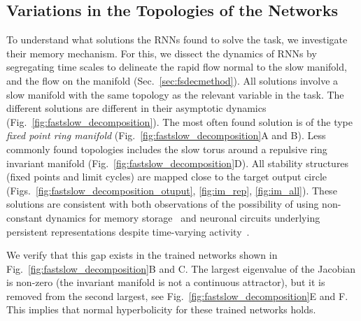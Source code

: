 \documentclass{article} %
\newcounter{ct}
\theoremstyle{definition}
\theoremstyle{remark}
\begin{document}
\subsection{Variations in the Topologies of the Networks}\label{sec:topologies}
To understand what solutions the RNNs found to solve the task, we investigate their memory mechanism.
For this, we dissect the dynamics of RNNs by segregating time scales to delineate the rapid flow normal to the slow manifold, and the flow on the manifold (Sec.~\ref{sec:fsdecmethod}).
All solutions involve a slow manifold with the same topology as the relevant variable in the task.
The different solutions are different in their asymptotic dynamics (Fig.~\ref{fig:fastslow_decomposition}).
The most often found solution is of the type \emph{fixed point ring manifold} (Fig.~\ref{fig:fastslow_decomposition}A and B).
Less commonly found topologies includes
the slow torus around a repulsive ring invariant manifold (Fig.~\ref{fig:fastslow_decomposition}D).
All stability structures (fixed points and limit cycles) are mapped close to the target output circle (Figs.~\ref{fig:fastslow_decomposition_otuput}, \ref{fig:im_rep}, \ref{fig:im_all}).
These solutions are consistent with both observations of the possibility of using non-constant dynamics for memory storage~\citep{hirsch1995computing, Park2023a} and neuronal circuits underlying persistent representations despite time-varying activity~\citep{druckmann2012neuronal}.

We verify that this gap exists in the trained networks shown in Fig.~\ref{fig:fastslow_decomposition}B and C.
The largest  eigenvalue of the Jacobian is non-zero (the invariant manifold is not a continuous attractor), but it is removed from the second largest, see Fig.~\ref{fig:fastslow_decomposition}E and F.
This implies that normal hyperbolicity for these trained networks holds.
\end{document}
